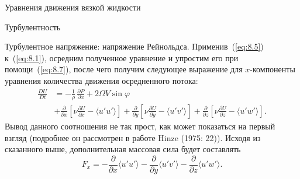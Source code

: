 \begin{chapter}{Уравнения движения вязкой жидкости}
\begin{section}{Турбулентность}
\begin{paragraph}{Турбулентное напряжение: напряжение Рейнольдса.}
Применив~(\ref{eq:8.5}) к~(\ref{eq:8.1}), осредним полученное уравнение
и упростим его при помощи~(\ref{eq:8.7}), после чего получим следующее
выражение для $x$-компоненты уравнения количества движения осредненного потока:
\begin{equation}\label{eq:8.10}
\begin{split}
\frac{DU}{Dt} & = -\frac{1}{\rho}\,\frac{\partial{P}}{\partial{x}}  + 2\Omega V\sin\varphi \\
  & + \frac{\partial }{\partial x} \left[ \nu \frac{\partial U}{\partial x} - \langle u'u'\rangle \right]
    + \frac{\partial }{\partial y} \left[ \nu \frac{\partial U}{\partial y} - \langle u'v'\rangle \right] +
      \frac{\partial }{\partial z} \left[ \nu \frac{\partial U}{\partial z} - \langle u'w'\rangle \right].
\end{split}
\end{equation}
Вывод данного соотношения не так прост, как может показаться на первый взгляд
(подробнее он рассмотрен в работе Hinze (1975: 22)). Исходя из сказанного выше,
дополнительная массовая сила будет составлять
\begin{equation}
F_x=-\frac{\partial}{\partial{x}}\langle u'u' \rangle
-\frac{\partial}{\partial{y}}\langle u'v' \rangle
-\frac{\partial}{\partial{z}}\langle u'w'\rangle.
\end{equation}
%


\end{paragraph}
\end{section}
\end{chapter}
